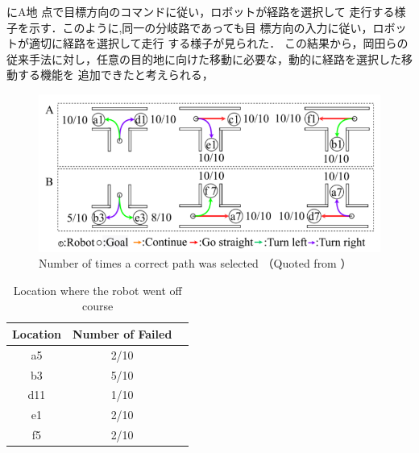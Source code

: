 にA地
点で目標方向のコマンドに従い，ロボットが経路を選択して
走行する様子を示す．このように,同一の分岐路であっても目
標方向の入力に従い，ロボットが適切に経路を選択して走行
する様子が見られた．
この結果から，岡田らの従来手法に対し，任意の目的地に向けた移動に必要な，動的に経路を選択した移動する機能を
追加できたと考えられる，
\begin{figure}[htbp]
    \centering
     \includegraphics[width=130mm]{images/pdf/haru_mech_res.pdf}
     \caption{Number of times a correct path was selected （Quoted from \cite{haruyama2022}）}
     \label{fig:haru_mech_ab_res}
\end{figure}
\vspace{-1zh}
\begin{table}[htbp]
    \centering
    \caption{Location where the robot went off course}\label{tab:path_res}
    \begin{tabular}{|c|c|c|}
    \hline
    Location & Number of Failed        \\
    \hline
    a5   & 2/10 \\
    b3   & 5/10 \\
    d11   & 1/10 \\
    e1  &  2/10 \\
    f5    & 2/10 \\
    \hline
    \end{tabular}
    \end{table}

